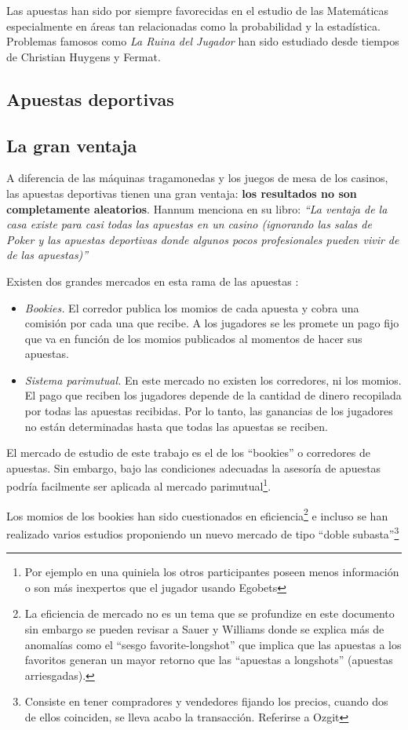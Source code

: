 Las apuestas han sido por siempre favorecidas en el estudio de las Matemáticas especialmente en áreas tan relacionadas como la probabilidad y la estadística.
Problemas famosos como \emph{La Ruina del Jugador} \cite[p.~95-99]{ross2006first} han sido estudiado desde tiempos de Christian Huygens y Fermat.

\subsection{Apuestas deportivas}

\subsection{La gran ventaja}

A diferencia de las máquinas tragamonedas y los juegos de mesa de los casinos, las apuestas deportivas tienen una gran ventaja: \textbf{los resultados no son completamente aleatorios}. Hannum menciona en su libro: \emph{``La ventaja de la casa existe para casi todas las apuestas en un casino (ignorando las salas de Poker y las apuestas deportivas donde algunos pocos profesionales pueden vivir de de las apuestas)''} \cite{hannum2005practical} 

Existen dos grandes mercados en esta rama de las apuestas \cite{chung2010empirical}:
\begin{itemize} 
	\item \emph{Bookies.} El corredor publica los momios de cada apuesta y cobra una comisión por cada una que recibe. A los jugadores se les promete un pago fijo que va en función de los momios publicados al momentos de hacer sus apuestas.
	\item \emph{Sistema parimutual.} En este mercado no existen los corredores, ni los momios. El pago que reciben los jugadores depende de la cantidad de dinero recopilada por todas las apuestas recibidas. Por lo tanto, las ganancias de los jugadores no están determinadas hasta que todas las apuestas se reciben.
	\end{itemize}

El mercado de estudio de este trabajo es el de los ``bookies'' o corredores de apuestas. Sin embargo, bajo las condiciones adecuadas la asesoría de apuestas podría facilmente ser aplicada al mercado parimutual\footnote{Por ejemplo en una quiniela los otros participantes poseen menos información o son más inexpertos que el jugador usando Egobets}.

Los momios de los bookies han sido cuestionados en eficiencia\footnote{La eficiencia de mercado no es un tema que se profundize en este documento sin embargo se pueden revisar a Sauer \cite{sauer1998economics} y Williams \cite{williams1999information} donde se explica más de anomalías como el ``sesgo favorite-longshot'' que implica que las apuestas a los favoritos generan un mayor retorno que las ``apuestas a longshots'' (apuestas arriesgadas).  } e incluso se han realizado varios estudios proponiendo un nuevo mercado de tipo ``doble subasta''\footnote{Consiste en tener compradores y vendedores fijando los precios, cuando dos de ellos coinciden, se lleva acabo la transacción. Referirse a Ozgit\cite{ozgit2005posted} }

